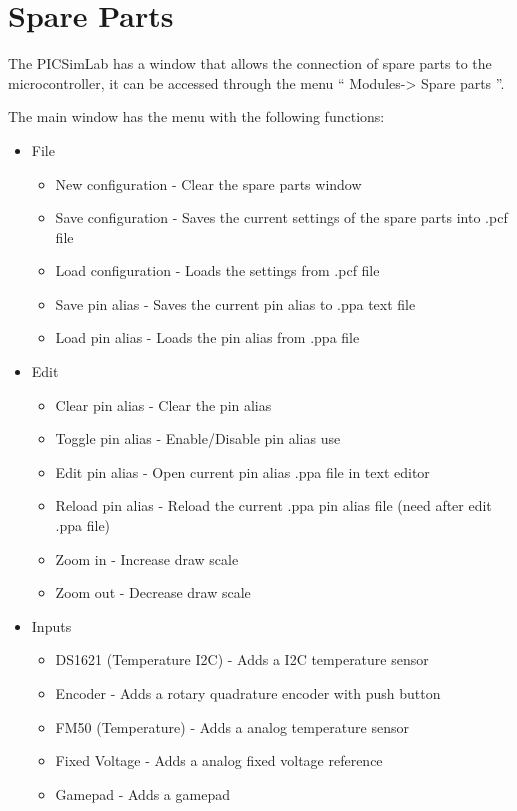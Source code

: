 

\chapter{Spare Parts} \hypertarget{def:spare}{}

The PICSimLab has a window that allows the connection of spare parts to the microcontroller, it can be accessed through the menu `` Modules-> Spare parts ''.

The main window has the menu with the following functions:
\begin{itemize}
 \item File
 \begin{itemize}
 \item New configuration - Clear the spare parts window 
 \item Save configuration - Saves the current settings of the spare parts into .pcf file
 \item Load configuration - Loads the settings from .pcf file
 \item Save pin alias - Saves the current pin alias to .ppa text file
 \item Load pin alias - Loads the pin alias from .ppa file
\end{itemize}
 \item Edit
 \begin{itemize}
 \item Clear pin alias - Clear the pin alias 
 \item Toggle pin alias - Enable/Disable pin alias use
 \item Edit pin alias - Open current pin alias .ppa file in text editor
 \item Reload pin alias - Reload the current .ppa pin alias file (need after edit .ppa file) 
 \item Zoom in - Increase draw scale
 \item Zoom out - Decrease draw scale
\end{itemize}
 \item Inputs
 \begin{itemize}
  \item DS1621 (Temperature I2C) -  Adds a I2C temperature sensor 
  \item Encoder - Adds a rotary quadrature encoder with push button
  \item FM50 (Temperature) - Adds a analog temperature sensor
  \item Fixed Voltage -  Adds a analog fixed voltage reference
  \item Gamepad - Adds a gamepad

\end{itemize}
\end{itemize}
